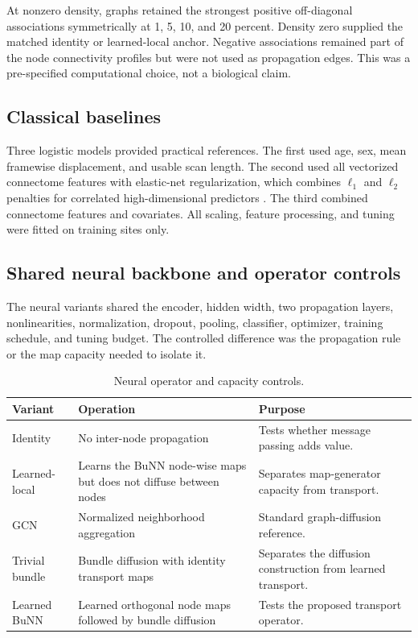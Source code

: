 \documentclass[11pt,a4paper]{article}
\begin{document}
At nonzero density, graphs retained the strongest positive off-diagonal
associations symmetrically at 1, 5, 10, and 20 percent. Density zero supplied
the matched identity or learned-local anchor. Negative associations remained
part of the node connectivity profiles but were not used as propagation edges.
This was a pre-specified computational choice, not a biological claim.

\subsection{Classical baselines}

Three logistic models provided practical references. The first used age, sex,
mean framewise displacement, and usable scan length. The second used all
vectorized connectome features with elastic-net regularization, which combines
$\ell_1$ and $\ell_2$ penalties for correlated high-dimensional predictors
\cite{zou2005elastic}. The third combined connectome features and covariates.
All scaling, feature processing, and tuning were fitted on training sites only.

\subsection{Shared neural backbone and operator controls}

The neural variants shared the encoder, hidden width, two propagation layers,
nonlinearities, normalization, dropout, pooling, classifier, optimizer,
training schedule, and tuning budget. The controlled difference was the
propagation rule or the map capacity needed to isolate it.

\begin{table}[htbp]
\centering
\caption{Neural operator and capacity controls.}
\label{tab:operators}
\begin{tabularx}{\textwidth}{@{}p{2.8cm}Y Y@{}}
\toprule
\textbf{Variant} & \textbf{Operation} & \textbf{Purpose} \\
\midrule
Identity & No inter-node propagation & Tests whether message passing adds value. \\
Learned-local & Learns the BuNN node-wise maps but does not diffuse between nodes & Separates map-generator capacity from transport. \\
GCN & Normalized neighborhood aggregation & Standard graph-diffusion reference. \\
Trivial bundle & Bundle diffusion with identity transport maps & Separates the diffusion construction from learned transport. \\
Learned BuNN & Learned orthogonal node maps followed by bundle diffusion & Tests the proposed transport operator. \\
\bottomrule
\end{tabularx}
\end{table}
\end{document}
